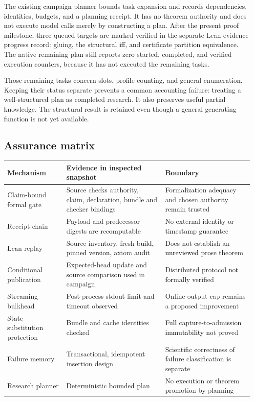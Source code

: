 \documentclass[11pt,reqno]{amsart}
\theoremstyle{definition}
\begin{document}
The existing campaign planner bounds task expansion and records dependencies,
identities, budgets, and a planning receipt. It has no theorem authority and
does not execute model calls merely by constructing a plan. After the present
proof milestone, three queued targets are marked verified in the separate
Lean-evidence progress record: gluing, the structural iff, and certificate
partition equivalence. The native remaining plan still reports zero started,
completed, and verified execution counters, because it has not executed
the remaining tasks.

Those remaining tasks concern slots, profile counting, and general
enumeration. Keeping their status separate prevents a common accounting
failure: treating a well-structured plan as completed research. It also
preserves useful partial knowledge. The structural result is retained even
though a general generating function is not yet available.

\subsection{Assurance matrix}
\begin{longtable}{p{}p{}p{}}
\toprule
Mechanism & Evidence in inspected snapshot & Boundary\\
\midrule\endhead
Claim-bound formal gate & Source checks authority, claim, declaration, bundle and checker bindings & Formalization adequacy and chosen authority remain trusted\\
Receipt chain & Payload and predecessor digests are recomputable & No external identity or timestamp guarantee\\
Lean replay & Source inventory, fresh build, pinned version, axiom audit & Does not establish an unreviewed prose theorem\\
Conditional publication & Expected-head update and source comparison used in campaign & Distributed protocol not formally verified\\
Streaming bulkhead & Post-process stdout limit and timeout observed & Online output cap remains a proposed improvement\\
State-substitution protection & Bundle and cache identities checked & Full capture-to-admission immutability not proved\\
Failure memory & Transactional, idempotent insertion design & Scientific correctness of failure classification is separate\\
Research planner & Deterministic bounded plan & No execution or theorem promotion by planning\\
\bottomrule
\end{longtable}
\end{document}
